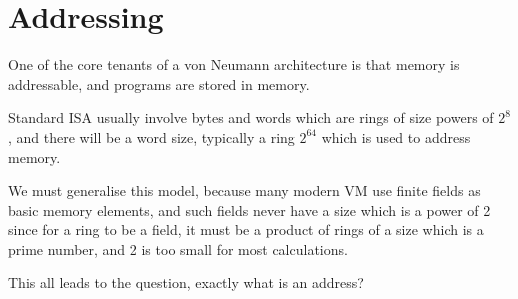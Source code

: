 \documentclass[oneside]{book}
\theoremstyle{plain}
\theoremstyle{definition}
\theoremstyle{plain}
\begin{document}
\chapter{Addressing}
One of the core tenants of a von Neumann architecture is that memory is
addressable, and programs are stored in memory.

Standard ISA usually involve bytes and words which are rings of size powers of $2^8$,
and there will be a word size, typically a ring $2^64$ which is used to address memory.

We must generalise this model, because many modern VM use finite fields as basic
memory elements, and such fields never have a size which is a power of 2 since
for a ring to be a field, it must be a product of rings of a size which is a prime number,
and 2 is too small for most calculations.

This all leads to the question, exactly what is an address?
\end{document}

